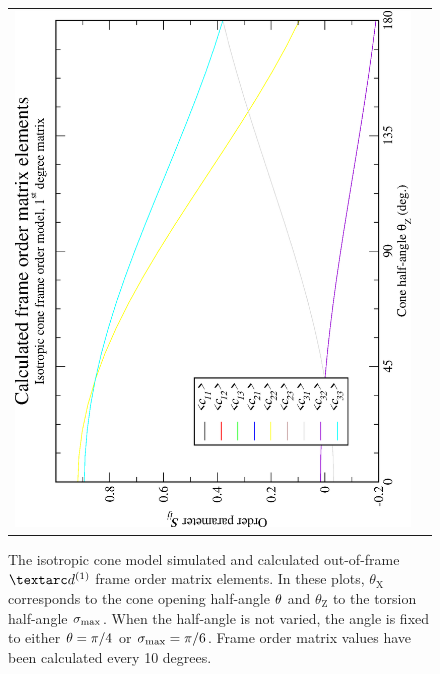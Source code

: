 \begin{figure}
\begin{tabular}{@{}cc@{}}
    \includegraphics[width=.35\textwidth,angle=270]{images/frame_order_matrix/Sij_iso_cone_out_of_frame_theta_z_calc.eps} \\
  \end{tabular}
  \caption[Isotropic cone simulated and calculated out-of-frame $\FOone$ elements.]{
    The isotropic cone model simulated and calculated out-of-frame $\FOone$ frame order matrix elements.
    In these plots, $\theta_\textrm{X}$ corresponds to the cone opening half-angle $\theta$ and $\theta_\textrm{Z}$ to the torsion half-angle $\sigma_\textrm{max}$.
    When the half-angle is not varied, the angle is fixed to either $\theta = \pi/4$ or $\sigma_\textrm{max} = \pi/6$.
    Frame order matrix values have been calculated every 10 degrees.
  }
  \label{fig: simulated and calculated out-of-frame 1st degree iso cone frame order}
\end{figure}

